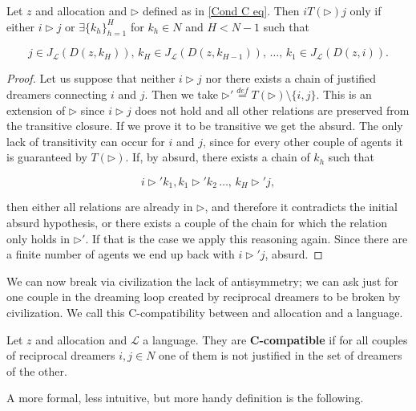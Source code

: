 \begin{proposition}\label{Prop: cond on transitive closure}
    Let $z$ and allocation and $\triangleright$ defined as in \ref{Cond C eq}. Then $iT(\triangleright)j$ only if either $i\triangleright j$ or $\exists \{k_h\}_{h=1}^H$ for $k_h \in N$ and $H<N-1$ such that

    \[j\in J_{\mathcal{L}}(D(z,k_H)),\, k_H \in J_{\mathcal{L}}(D(z,k_{H-1})),\,\dots,\, k_1\in J_{\mathcal{L}}(D(z,i)).\]

    \begin{proof}
        Let us suppose that neither $i\triangleright j$ nor there exists a chain of justified dreamers connecting $i$ and $j$. Then we take $\triangleright'\overset{def}{=}T(\triangleright)\setminus\{i,j\}$. This is an extension of $\triangleright$ since $i\triangleright j$ does not hold and all other relations are preserved from the transitive closure. If we prove it to be transitive we get the absurd. The only lack of transitivity can occur for $i$ and $j$, since for every other couple of agents it is guaranteed by $T(\triangleright)$. If, by absurd, there exists a chain of $k_h$ such that

        \[i\triangleright'k_1, k_1\triangleright'k_2\,\dots,\,k_H\triangleright'j,\]

        then either all relations are already in $\triangleright$, and therefore it contradicts the initial absurd hypothesis, or there exists a couple of the chain for which the relation only holds in $\triangleright'$. If that is the case we apply this reasoning again. Since there are a finite number of agents we end up back with $i\triangleright'j$, absurd.
    \end{proof}
\end{proposition}

We can now break via civilization the lack of antisymmetry; we can ask just for one couple in the dreaming loop created by reciprocal dreamers to be broken by civilization. We call this C-compatibility between and allocation and a language.

\begin{definition}
    Let $z$ and allocation and $\mathcal{L}$ a language. They are \textbf{C-compatible} if for all couples of reciprocal dreamers $i,j\in N$ one of them is not justified in the set of dreamers of the other. 
\end{definition}

A more formal, less intuitive, but more handy definition is the following.

